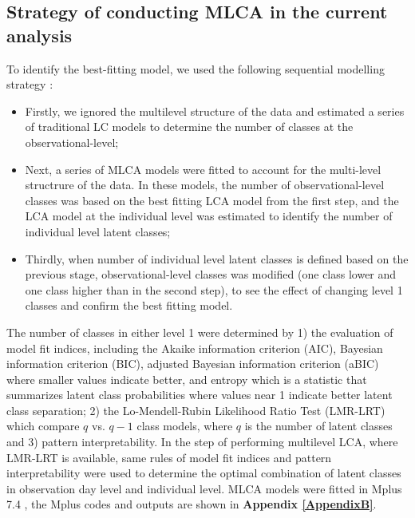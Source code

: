 \subsection{Strategy of conducting MLCA in the current analysis}\vspace{-0.3cm}

To identify the best-fitting model, we used the following sequential modelling strategy \parencite{henry2010multilevel}: 

\begin{itemize}
	\item Firstly, we ignored the multilevel structure of the data and estimated a series of traditional LC models to determine the number of classes at the observational-level;
	\item Next, a series of MLCA models were fitted to account for the multi-level structrure of the data. In these models, the number of observational-level classes was based on the best fitting LCA model from the first step, and the LCA model at the individual level was estimated to identify the number of individual level latent classes;
	\item Thirdly, when number of individual level latent classes is defined based on the previous stage, observational-level classes was modified (one class lower and one class higher than in the second step), to see the effect of changing level 1 classes and confirm the best fitting model.
\end{itemize}

The number of classes in either level 1 were determined by 1) the evaluation of model fit indices, including the Akaike information criterion (AIC), Bayesian information criterion (BIC), adjusted Bayesian information criterion (aBIC) where smaller values indicate better, and entropy which is a statistic that summarizes latent class probabilities where values near 1 indicate better latent class separation; 2) the Lo-Mendell-Rubin Likelihood Ratio Test (LMR-LRT) \parencite{lo2001testing, nylund2007deciding} which compare $q$ vs. $q-1$ class models, where $q$ is the number of latent classes and 3) pattern interpretability. In the step of performing multilevel LCA, where LMR-LRT is available, same rules of model fit indices and pattern interpretability were used to determine the optimal combination of latent classes in observation day level and individual level. MLCA models were fitted in Mplus 7.4 \parencite{muthen2005mplus}, the Mplus codes and outputs are shown in \textbf{Appendix \ref{AppendixB}}. \vspace{-0.3cm}



